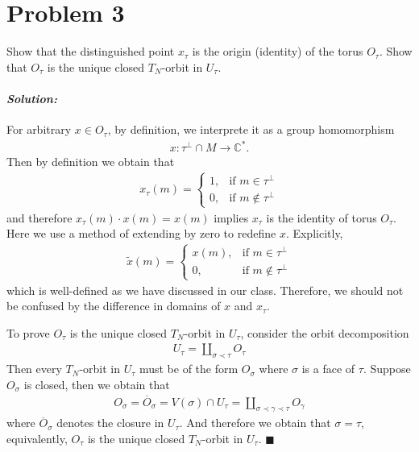 \documentclass[12pt, a4paper]{article}
\newenvironment{solution}
  {\paragraph{\textit{Solution:}}\par\medskip}
  {\hfill$\blacksquare$\vspace{0.1cm}}
\begin{document}
\section*{Problem 3}
Show that the distinguished point $x_\tau$ is the origin (identity) of the torus $O_\tau$. Show that $O_\tau$ is the unique closed $T_N$-orbit in $U_\tau$.
\begin{solution}
    For arbitrary $x\in O_{\tau}$, by definition, we interprete it as a group homomorphism
    \begin{align*}
        x:\tau^\perp\cap M\to \mathbb{C}^*.
    \end{align*}
    Then by definition we obtain that 
    \begin{align*}
        x_{\tau}(m)= 
\begin{cases} 
1, & \text{if } m \in \tau^\perp \\ 
0, & \text{if } m \notin \tau^\perp 
\end{cases}
    \end{align*}
    and therefore $x_{\tau}(m)\cdot x(m)= x(m)$ implies $x_\tau$ is the identity of torus $O_\tau$.
    Here we use a method of extending by zero to redefine $x$. Explicitly, 
    \begin{align*}
        \tilde{x}(m)= 
        \begin{cases} 
x(m), & \text{if } m \in \tau^\perp \\ 
0, & \text{if } m \notin \tau^\perp 
\end{cases}
    \end{align*}
    which is well-defined as we have discussed in our class. Therefore, we should not be confused by the difference in domains of $x$ and $x_\tau$.

    To prove $O_{\tau}$ is the unique closed $T_N$-orbit in $U_\tau$,
    consider the orbit decomposition 
    \begin{align*}
        U_\tau = \coprod_{\sigma\prec\tau} O_{\tau}
    \end{align*}
    Then every $T_N$-orbit in $U_\tau$ must be of the form $O_{\sigma}$ where $\sigma$ is a face of $\tau$.
    Suppose $O_\sigma$ is closed, then we obtain that 
    \begin{align*}
        O_\sigma = \overline{O}_\sigma = V(\sigma) \cap U_{\tau} =  \coprod_{\sigma\prec\gamma\prec\tau} O_{\gamma}
    \end{align*}
    where $\overline{O}_\sigma$ denotes the closure in $U_\tau$. And therefore we obtain that $\sigma=\tau$, equivalently, $O_\tau$ is the unique closed $T_N$-orbit in $U_\tau$.
\end{solution}
\end{document}
